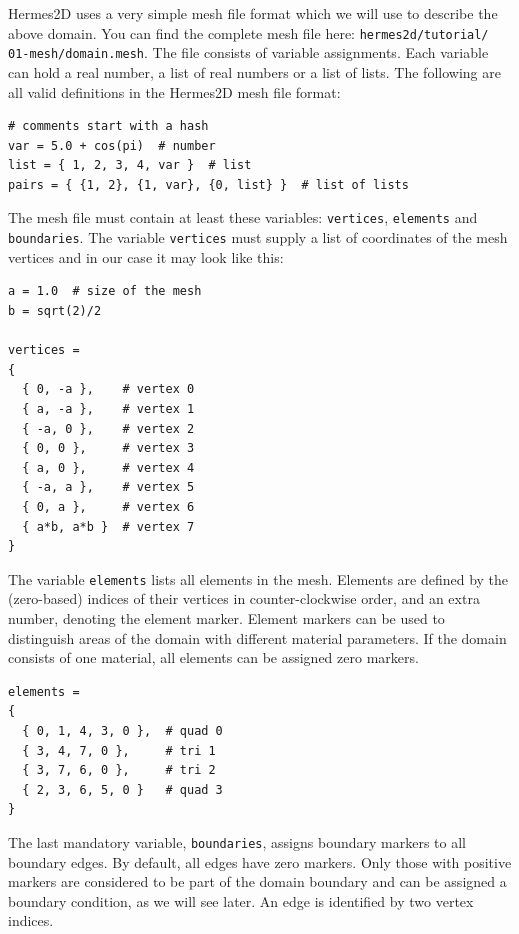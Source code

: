 \documentclass[11pt]{article}
\begin{document}
Hermes2D uses a very simple mesh file format which we will use to describe the above
domain. You can find the complete mesh file here: {\tt hermes2d/tutorial/ 01-mesh/domain.mesh}.
The file consists of variable assignments. Each variable can hold a real number,
a list of real numbers or a list of lists. The following are all valid definitions
in the Hermes2D mesh file format:

\lstset{language=make}
\begin{lstlisting}
# comments start with a hash
var = 5.0 + cos(pi)  # number
list = { 1, 2, 3, 4, var }  # list
pairs = { {1, 2}, {1, var}, {0, list} }  # list of lists
\end{lstlisting}

The mesh file must contain at least these variables: {\tt vertices}, {\tt elements} and
{\tt boundaries}. The variable {\tt vertices} must supply a list of coordinates of the
mesh vertices and in our case it may look like this:

\begin{lstlisting}
a = 1.0  # size of the mesh
b = sqrt(2)/2

vertices =
{
  { 0, -a },    # vertex 0
  { a, -a },    # vertex 1
  { -a, 0 },    # vertex 2
  { 0, 0 },     # vertex 3
  { a, 0 },     # vertex 4
  { -a, a },    # vertex 5
  { 0, a },     # vertex 6
  { a*b, a*b }  # vertex 7
}
\end{lstlisting}

The variable {\tt elements} lists all elements in the mesh.
Elements are defined by the (zero-based) indices of their vertices in
counter-clockwise order, and an extra number, denoting the element marker.
Element markers can be used to distinguish areas of the domain with different
material parameters. If the domain consists of one material,
all elements can be assigned zero markers.

\begin{lstlisting}
elements =
{
  { 0, 1, 4, 3, 0 },  # quad 0
  { 3, 4, 7, 0 },     # tri 1
  { 3, 7, 6, 0 },     # tri 2
  { 2, 3, 6, 5, 0 }   # quad 3
}
\end{lstlisting}

The last mandatory variable, {\tt boundaries}, assigns boundary markers to
all boundary edges. By default, all edges have zero markers. Only those with
positive markers are considered to be part of the domain boundary and can be
assigned a boundary condition, as we will see later.
An edge is identified by two vertex indices.
\end{document}
